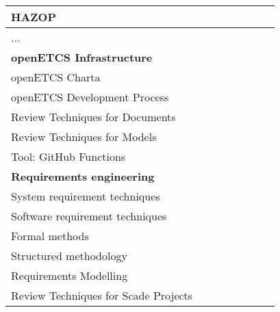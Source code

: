 \documentclass[a4paper, 11pt]{article}
\begin{document}
\begin{center}
\begin{longtable}{|r|r|r|r|r|r|r|r|}
    \hline
    \multicolumn{1}{|l|}{HAZOP} & \multicolumn{1}{c|}{} &       &       &       &       &       &  \bigstrut\\
    \hline
    \multicolumn{1}{|l|}{...} & \multicolumn{1}{c|}{} &       &       &       &       &       &  \bigstrut[t]\\
    \hline    
    \multicolumn{1}{|l|}{\textbf{openETCS Infrastructure}} & \multicolumn{1}{l|}{\textbf{}} &       &       &       &       &       &  \\
    \multicolumn{1}{|l|}{openETCS Charta} & \multicolumn{1}{l|}{} &       &       &       &       &       &  \bigstrut[b]\\
    \hline
    \multicolumn{1}{|l|}{openETCS Development Process} & \multicolumn{1}{l|}{} &       &       &       &       &       &  \bigstrut[b]\\
    \hline
    \multicolumn{1}{|l|}{Review Techniques for Documents} & \multicolumn{1}{l|}{} &       &       &       &       &       &  \bigstrut[b]\\
    \hline
    \multicolumn{1}{|l|}{Review Techniques for Models} & \multicolumn{1}{l|}{} &       &       &       &       &       &  \bigstrut[b]\\
    \hline
    \multicolumn{1}{|l|}{Tool: GitHub Functions} & \multicolumn{1}{l|}{} &       &       &       &       &       &  \bigstrut[b]\\
    \hline
    \multicolumn{1}{|l|}{\textbf{Requirements engineering}} & \multicolumn{1}{l|}{\textbf{}} &       &       &       &       &       &  \\
    \hline
    \multicolumn{1}{|l|}{System requirement techniques} & \multicolumn{1}{l|}{} &       &       &       &       &       &  \bigstrut[b]\\
    \hline
    \multicolumn{1}{|l|}{Software requirement techniques} & \multicolumn{1}{l|}{} &       &       &       &       &       &  \bigstrut\\
    \hline
    \multicolumn{1}{|l|}{Formal methods} & \multicolumn{1}{l|}{} &       &       &       &       &       &  \bigstrut\\
    \hline
    \multicolumn{1}{|l|}{Structured methodology} & \multicolumn{1}{l|}{} &       &       &       &       &       &  \bigstrut\\
    \hline
    \multicolumn{1}{|l|}{Requirements Modelling} & \multicolumn{1}{l|}{} &       &       &       &       &       &  \bigstrut\\
    \hline
    \multicolumn{1}{|l|}{Review Techniques for Scade Projects} & \multicolumn{1}{l|}{} &       &       &       &       &       &  \bigstrut\\

\end{longtable}
\end{center}
\end{document}

